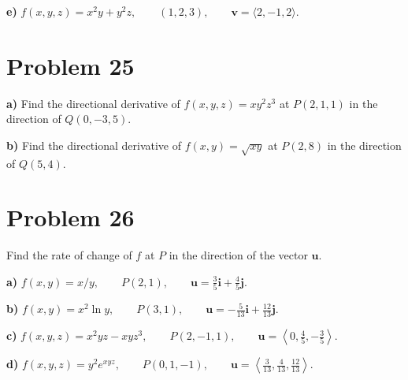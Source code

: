 \documentclass[11pt]{article}
\begin{document}
\textbf{e)} $f(x,y,z) = x^2 y + y^2 z, \qquad (1,2,3), \qquad \mathbf{v} = \langle 2, -1, 2 \rangle$.


\section*{Problem 25}

\textbf{a)} Find the directional derivative of $f(x,y,z) = xy^2 z^3$ at $P(2,1,1)$ in the direction of $Q(0,-3,5)$.

\textbf{b)} Find the directional derivative of $f(x,y) = \sqrt{xy}$ at $P(2,8)$ in the direction of $Q(5,4)$.


\section*{Problem 26}

Find the rate of change of $f$ at $P$ in the direction of the vector $\mathbf{u}$.

\textbf{a)} $f(x,y) = x/y, \qquad P(2,1), \qquad \mathbf{u} = \frac{3}{5}\mathbf{i} + \frac{4}{5}\mathbf{j}$.

\textbf{b)} $f(x,y) = x^2 \ln y, \qquad P(3,1), \qquad \mathbf{u} = -\frac{5}{13}\mathbf{i} + \frac{12}{13}\mathbf{j}$.

\textbf{c)} $f(x,y,z) = x^2 yz - xyz^3, \qquad P(2,-1,1), \qquad \mathbf{u} = \left\langle 0, \frac{4}{5}, -\frac{3}{5} \right\rangle$.

\textbf{d)} $f(x,y,z) = y^2 e^{xyz}, \qquad P(0,1,-1), \qquad \mathbf{u} = \left\langle \frac{3}{13}, \frac{4}{13}, \frac{12}{13} \right\rangle$.
\end{document}
